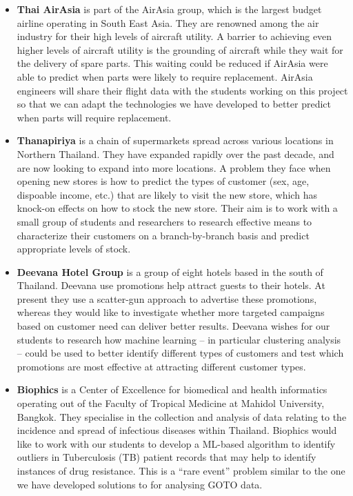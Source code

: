 \documentclass[11pt]{article}
\begin{document}
  \begin{itemize}[leftmargin=6mm,itemsep=-3pt,topsep=1pt]
    \item {\bf Thai AirAsia} is part of the AirAsia group, which is the largest budget airline operating in South East Asia. They are renowned among the air industry for their high levels of aircraft utility. A barrier to achieving even higher levels of aircraft utility is the grounding of aircraft while they wait for the delivery of spare parts. This waiting could be reduced if AirAsia were able to predict when parts were likely to require replacement. AirAsia engineers will share their flight data with the students working on this project so that we can adapt the technologies we have developed to better predict when parts will require replacement.
    \item {\bf Thanapiriya} is a chain of supermarkets spread across various locations in Northern Thailand. They have expanded rapidly over the past decade, and are now looking to expand into more locations. A problem they face when opening new stores is how to predict the types of customer (sex, age, dispoable income, etc.) that are likely to visit the new store, which has knock-on effects on how to stock the new store. Their aim is to work with a small group of students and researchers to research effective means to characterize their customers on a branch-by-branch basis and predict appropriate levels of stock.
    \item {\bf Deevana Hotel Group} is a group of eight hotels based in the south of Thailand. Deevana use promotions help attract guests to their hotels. At present they use a scatter-gun approach to advertise these promotions, whereas they would like to investigate whether more targeted campaigns based on customer need can deliver better results. Deevana wishes for our students to research how machine learning -- in particular clustering analysis -- could be used to better identify different types of customers and test which promotions are most effective at attracting different customer types.
    \item {\bf Biophics} is a Center of Excellence for biomedical and health informatics operating out of the Faculty of Tropical Medicine at Mahidol University, Bangkok. They specialise in the collection and analysis of data relating to the incidence and spread of infectious diseases within Thailand. Biophics would like to work with our students to develop a ML-based algorithm to identify outliers in Tuberculosis (TB) patient records that may help to identify instances of drug resistance. This is a ``rare event'' problem similar to the one we have developed solutions to for analysing GOTO data.

\end{itemize}
\end{document}
